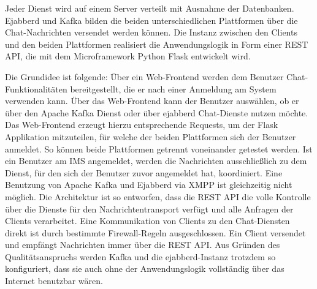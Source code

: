 \documentclass[a4paper,titlepage,halfparskip,12pt]{scrreprt}
\begin{document}
\begin{onehalfspacing}
Jeder Dienst wird auf einem Server verteilt mit Ausnahme der Datenbanken. Ejabberd und Kafka bilden die beiden unterschiedlichen Plattformen über die Chat-Nachrichten versendet werden können. Die Instanz zwischen den Clients und den beiden Plattformen realisiert die Anwendungslogik in Form einer \acs{REST} \acs{API}, die mit dem Microframework Python Flask entwickelt wird.

Die Grundidee ist folgende: Über ein Web-Frontend werden dem Benutzer Chat-Funktionalitäten bereitgestellt, die er nach einer Anmeldung am System verwenden kann. Über das Web-Frontend kann der Benutzer auswählen, ob er über den Apache Kafka Dienst oder über ejabberd Chat-Dienste nutzen möchte. Das Web-Frontend erzeugt hierzu entsprechende Requests, um der Flask Applikation mitzuteilen, für welche der beiden Plattformen sich der Benutzer anmeldet. So können beide Plattformen getrennt voneinander getestet werden. Ist ein Benutzer am \ac{IMS} angemeldet, werden die Nachrichten ausschließlich zu dem Dienst, für den sich der Benutzer zuvor angemeldet hat, koordiniert. Eine Benutzung von Apache Kafka und Ejabberd via \ac{XMPP} ist gleichzeitig nicht möglich. Die Architektur ist so entworfen, dass die \acs{REST} \acs{API} die volle Kontrolle über die Dienste für den Nachrichtentransport verfügt und alle Anfragen der Clients verarbeitet. Eine Kommunikation von Clients zu den Chat-Diensten direkt ist durch bestimmte Firewall-Regeln ausgeschlossen. Ein Client versendet und empfängt Nachrichten immer über die \acs{REST} \acs{API}. Aus Gründen des Qualitätsanspruchs werden Kafka und die ejabberd-Instanz trotzdem so konfiguriert, dass sie auch ohne der Anwendungslogik vollständig über das Internet benutzbar wären.


\end{onehalfspacing}
\end{document}
